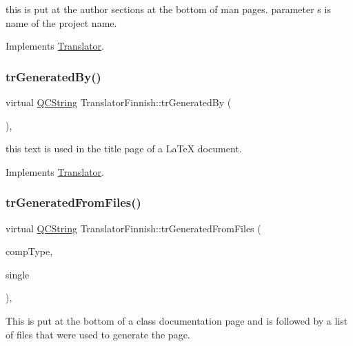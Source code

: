 this is put at the author sections at the bottom of man pages. parameter s is name of the project name. 

Implements \mbox{\hyperlink{class_translator}{Translator}}.

\mbox{\label{class_translator_finnish_a4c6ed988c443e3c0d79ca130ff2a7874}} 
\subsubsection{\texorpdfstring{trGeneratedBy()}{trGeneratedBy()}}
{\footnotesize\ttfamily virtual \mbox{\hyperlink{class_q_c_string}{Q\+C\+String}} Translator\+Finnish\+::tr\+Generated\+By (\begin{DoxyParamCaption}{ }\end{DoxyParamCaption})\hspace{0.3cm}{\ttfamily [inline]}, {\ttfamily [virtual]}}

this text is used in the title page of a La\+TeX document. 

Implements \mbox{\hyperlink{class_translator}{Translator}}.

\mbox{\label{class_translator_finnish_a4d17559a2ec6c097d7f9e38d52368e78}} 
\subsubsection{\texorpdfstring{trGeneratedFromFiles()}{trGeneratedFromFiles()}}
{\footnotesize\ttfamily virtual \mbox{\hyperlink{class_q_c_string}{Q\+C\+String}} Translator\+Finnish\+::tr\+Generated\+From\+Files (\begin{DoxyParamCaption}\item[{\mbox{\hyperlink{class_class_def_ae70cf86d35fe954a94c566fbcfc87939}{Class\+Def\+::\+Compound\+Type}}}]{comp\+Type,  }\item[{bool}]{single }\end{DoxyParamCaption})\hspace{0.3cm}{\ttfamily [inline]}, {\ttfamily [virtual]}}

This is put at the bottom of a class documentation page and is followed by a list of files that were used to generate the page. 

